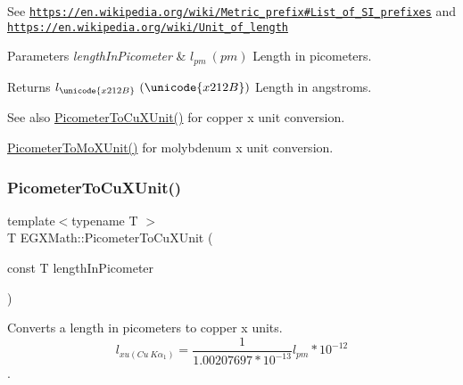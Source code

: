 See \href{https://en.wikipedia.org/wiki/Metric_prefix#List_of_SI_prefixes}{\tt https\+://en.\+wikipedia.\+org/wiki/\+Metric\+\_\+prefix\#\+List\+\_\+of\+\_\+\+S\+I\+\_\+prefixes} and \href{https://en.wikipedia.org/wiki/Unit_of_length}{\tt https\+://en.\+wikipedia.\+org/wiki/\+Unit\+\_\+of\+\_\+length} 
\begin{DoxyParams}{Parameters}
{\em length\+In\+Picometer} & $ l_{pm}\ (pm)$ Length in picometers. \\
\hline
\end{DoxyParams}
\begin{DoxyReturn}{Returns}
$ l_{\unicode{x212B}}\ (\unicode{x212B})$ Length in angstroms. 
\end{DoxyReturn}
\begin{DoxySeeAlso}{See also}
\mbox{\hyperlink{group___e_g_x_math-_conversions-_length_conversions-_s_i-_picometer-_non-_s_i_gab393c0c7c90ba14ff56f8eac343524ff}{Picometer\+To\+Cu\+X\+Unit()}} for copper x unit conversion. 

\mbox{\hyperlink{group___e_g_x_math-_conversions-_length_conversions-_s_i-_picometer-_non-_s_i_ga51b96b4bb30b7e9c971db81ff89a82f8}{Picometer\+To\+Mo\+X\+Unit()}} for molybdenum x unit conversion. 
\end{DoxySeeAlso}
\mbox{\label{group___e_g_x_math-_conversions-_length_conversions-_s_i-_picometer-_non-_s_i_gab393c0c7c90ba14ff56f8eac343524ff}} 
\subsubsection{\texorpdfstring{Picometer\+To\+Cu\+X\+Unit()}{PicometerToCuXUnit()}}
{\footnotesize\ttfamily template$<$typename T $>$ \\
T E\+G\+X\+Math\+::\+Picometer\+To\+Cu\+X\+Unit (\begin{DoxyParamCaption}\item[{const T}]{length\+In\+Picometer }\end{DoxyParamCaption})}



Converts a length in picometers to copper x units. \[ l_{xu(Cu\ K\alpha_1)}= \frac{1}{1.00207697*10^{-13}} l_{pm} * 10^{-12}\]. 


